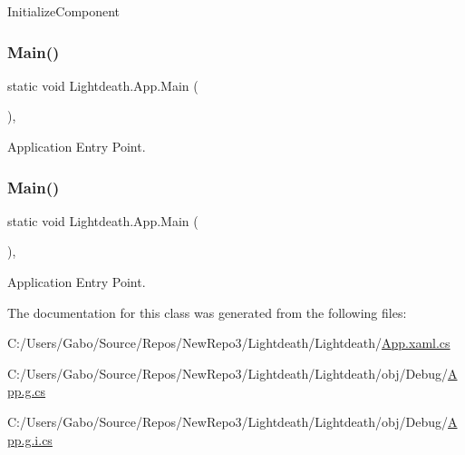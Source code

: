 Initialize\+Component 

\hypertarget{class_lightdeath_1_1_app_a6526b52830e1c93ae27540772cb8411f}{}\label{class_lightdeath_1_1_app_a6526b52830e1c93ae27540772cb8411f} 
\subsubsection{\texorpdfstring{Main()}{Main()}\hspace{0.1cm}{\footnotesize\ttfamily [1/2]}}
{\footnotesize\ttfamily static void Lightdeath.\+App.\+Main (\begin{DoxyParamCaption}{ }\end{DoxyParamCaption})\hspace{0.3cm}{\ttfamily [inline]}, {\ttfamily [static]}}



Application Entry Point. 

\hypertarget{class_lightdeath_1_1_app_a6526b52830e1c93ae27540772cb8411f}{}\label{class_lightdeath_1_1_app_a6526b52830e1c93ae27540772cb8411f} 
\subsubsection{\texorpdfstring{Main()}{Main()}\hspace{0.1cm}{\footnotesize\ttfamily [2/2]}}
{\footnotesize\ttfamily static void Lightdeath.\+App.\+Main (\begin{DoxyParamCaption}{ }\end{DoxyParamCaption})\hspace{0.3cm}{\ttfamily [inline]}, {\ttfamily [static]}}



Application Entry Point. 



The documentation for this class was generated from the following files\+:\begin{DoxyCompactItemize}
\item 
C\+:/\+Users/\+Gabo/\+Source/\+Repos/\+New\+Repo3/\+Lightdeath/\+Lightdeath/\hyperlink{_app_8xaml_8cs}{App.\+xaml.\+cs}\item 
C\+:/\+Users/\+Gabo/\+Source/\+Repos/\+New\+Repo3/\+Lightdeath/\+Lightdeath/obj/\+Debug/\hyperlink{_app_8g_8cs}{App.\+g.\+cs}\item 
C\+:/\+Users/\+Gabo/\+Source/\+Repos/\+New\+Repo3/\+Lightdeath/\+Lightdeath/obj/\+Debug/\hyperlink{_app_8g_8i_8cs}{App.\+g.\+i.\+cs}\end{DoxyCompactItemize}
